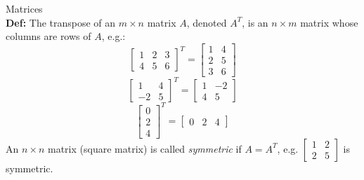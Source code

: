 \documentclass[]{article}
\begin{document}
		\large{Matrices}\\
		\normalsize
		{\bf Def:} The transpose of an $m\times n$ matrix $A$, denoted $A^T$, is an $n\times m$ matrix whose columns are rows of $A$, e.g.:
		$$
			\begin{bmatrix}
				{1}&{2}&{3}\\
				{4}&{5}&{6}
			\end{bmatrix}^T=
			\begin{bmatrix}
				{1}&{4}\\
				{2}&{5}\\
				{3}&{6}
			\end{bmatrix}
		$$
		$$
			\begin{bmatrix}
				{1}&{4}\\
				{-2}&{5}
			\end{bmatrix}^T=
			\begin{bmatrix}
				{1}&{-2}\\
				{4}&{5}
			\end{bmatrix}
		$$
		$$
			\begin{bmatrix}
				{0}\\{2}\\{4}
			\end{bmatrix}^T=
			\begin{bmatrix}
				{0}&{2}&{4}
			\end{bmatrix}
		$$
		An $n\times n$ matrix (square matrix) is called \emph{symmetric} if $A=A^T$, e.g. $\begin{bmatrix}{1}&{2}\\{2}&{5}\end{bmatrix}$ is symmetric.
\end{document}

